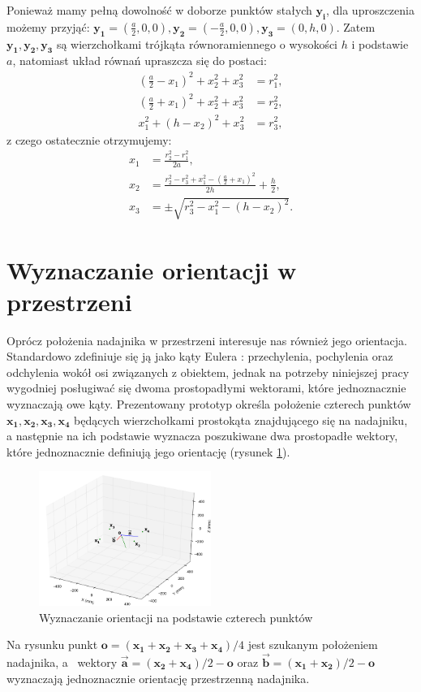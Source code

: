 Ponieważ mamy pełną dowolność w doborze punktów stałych $\boldsymbol{y_i}$, dla uproszczenia możemy przyjąć:
$\boldsymbol{y_1}=(\frac{a}{2},0,0), \boldsymbol{y_2}=(-\frac{a}{2},0,0), \boldsymbol{y_3}=(0,h,0)$. 
Zatem $\boldsymbol{y_1}, \boldsymbol{y_2}, \boldsymbol{y_3}$ są wierzchołkami
trójkąta równoramiennego o wysokości $h$ i podstawie $a$, natomiast układ równań upraszcza
się do postaci:
\[
 \begin{align}
     (\frac{a}{2}-x_1)^2 + x_2^2 + x_3^2 &= r_1^2,
 \\  (\frac{a}{2}+x_1)^2 + x_2^2 + x_3^2 &= r_2^2,
 \\  x_1^2 + (h-x_2)^2 + x_3^2 &= r_3^2,
 \end{align}
\]
z czego ostatecznie otrzymujemy:
\[
 \begin{align}
     x_1 &= \frac{r_2^2 - r_1^2}{2a},
 \\  x_2 &= \frac{r_2^2 - r_3^2 + x_1^2 - (\frac{a}{2}+x_1)^2}{2h}  + \frac{h}{2},
 \\  x_3 &= \pm \sqrt{r_3^2-x_1^2-(h-x_2)^2}.
 \end{align}
\]


\section{Wyznaczanie orientacji w przestrzeni}

Oprócz położenia nadajnika w przestrzeni interesuje nas również jego orientacja.
Standardowo zdefiniuje się ją jako kąty Eulera \cite{bib:katyEulera}: przechylenia, 
pochylenia oraz odchylenia wokół osi związanych z obiektem, jednak na potrzeby niniejszej pracy wygodniej 
posługiwać się dwoma prostopadłymi wektorami, które jednoznacznie wyznaczają owe kąty. 
Prezentowany prototyp określa położenie czterech punktów $\boldsymbol{x_1, x_2, x_3, x_4}$ będących wierzchołkami prostokąta 
znajdującego się na nadajniku, a następnie na ich podstawie wyznacza poszukiwane dwa prostopadłe wektory, które jednoznacznie
definiują jego orientację (rysunek \ref{fig:orientacja}).
 \begin{figure}[H]
    \centering
    \includegraphics[width=0.5\textwidth, trim= 0mm 0mm 0mm 0mm,clip]{orientacja}
    \caption{Wyznaczanie orientacji na podstawie czterech punktów}
    \label{fig:orientacja}
\end{figure}
Na rysunku punkt $\boldsymbol{o} = (\boldsymbol{x_1} + \boldsymbol{x_2} + \boldsymbol{x_3} + \boldsymbol{x_4})/4$ jest szukanym położeniem
nadajnika, a~ wektory $\boldsymbol{\overrightarrow{a}} = (\boldsymbol{x_2} + \boldsymbol{x_4})/2 - \boldsymbol{o}$ oraz 
$\boldsymbol{\overrightarrow{b}} = (\boldsymbol{x_1} + \boldsymbol{x_2})/2 - \boldsymbol{o}$ wyznaczają jednoznacznie
orientację przestrzenną nadajnika.

